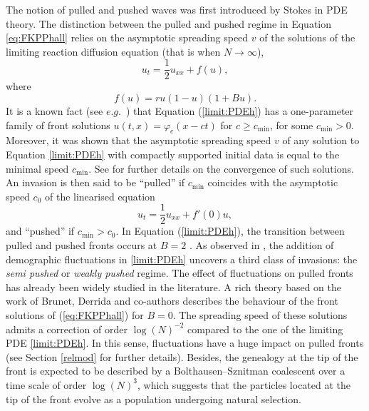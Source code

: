 \documentclass[11pt]{article}
\theoremstyle{plain}
\begin{document}
The notion of pulled and pushed waves was first introduced by Stokes \cite{stokes1976two} in PDE theory. The distinction between the pulled and pushed regime in Equation \eqref{eq:FKPPhall} relies on the asymptotic spreading speed $v$ of the solutions of the limiting reaction diffusion equation (that is when $N\to\infty$), 
\begin{equation}
u_t=\frac{1}{2}u_{xx}+f(u), \label{limit:PDEh}
\end{equation} 
where 
\begin{equation}
f(u)=ru(1-u)(1+Bu). \label {reactionterm}
\end{equation}
It is a known fact (see $e.g.$~\cite{Hadeler:1975uk}) that Equation (\ref{limit:PDEh}) has a one-parameter family of front solutions $u(t,x)=\varphi_c(x-ct)$ for  $c\geqslant c_{\min}$, for some $c_{\min}>0$. Moreover, it was shown \cite{stokes1977nonlinear} that the asymptotic spreading speed $v$ of any solution to Equation \eqref{limit:PDEh} with compactly supported initial data is equal to the minimal speed $c_{\min}$. See \cite[Chapter 1]{these} for further details on the convergence of such solutions.
An invasion is then said to be ``pulled'' if $c_{\min}$ coincides with the asymptotic speed $c_0$ of the linearised equation
\begin{equation*}
u_t=\frac{1}{2}u_{xx}+f'(0)u,
\end{equation*}
and ``pushed'' if $c_{\min}>c_0$. 
In Equation (\ref{limit:PDEh}), the transition between pulled and pushed fronts occurs at $B=2$ \cite{Hadeler:1975uk}.  
  As observed in \cite{Birzu2018}, the addition of demographic fluctuations in \eqref{limit:PDEh} uncovers a third class of invasions: the \textit{semi pushed} or \textit{weakly pushed} regime. The effect of fluctuations on pulled fronts has already been widely studied in the literature. A rich theory based on the work of  Brunet, Derrida and co-authors \cite{Brunet1997,Brunet2006,Brunet2006a} describes the behaviour of the front solutions of (\ref{eq:FKPPhall}) for $B=0$. The spreading speed of these solutions admits a correction of order $\log(N)^{-2}$ compared to the one of the limiting PDE \eqref{limit:PDEh}. In this sense, fluctuations have a huge impact on pulled fronts (see Section \ref{relmod} for further details). Besides, the genealogy at the tip of the front is expected to be described by a Bolthausen--Sznitman coalescent over a time scale of order $\log(N)^3$, which suggests that the particles located at the tip of the front evolve as a population undergoing natural selection.  
  
\end{document}
